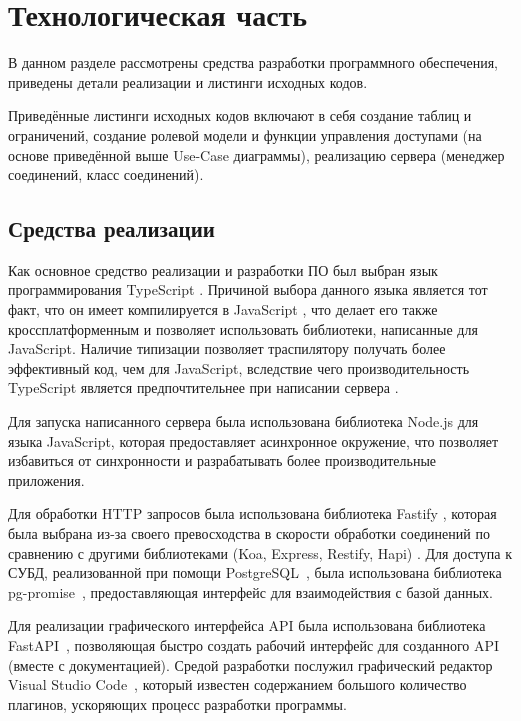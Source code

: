 \section{\large Технологическая часть}

В  данном  разделе  рассмотрены  средства  разработки  программного
обеспечения, приведены детали реализации и листинги исходных кодов.

Приведённые листинги исходных кодов включают в себя создание таблиц и ограничений, создание ролевой модели и функции управления доступами (на основе приведённой выше Use-Case диаграммы), реализацию сервера (менеджер соединений, класс соединений).

\subsection{Средства реализации}
Как  основное  средство  реализации  и  разработки  ПО  был  выбран  язык
программирования  TypeScript \cite{ts}.
Причиной  выбора  данного  языка  является  тот факт,  что  он  имеет компилируется в JavaScript \cite{js}, что делает его также кроссплатформенным и позволяет использовать библиотеки, написанные для JavaScript. 
Наличие типизации позволяет траспилятору получать более эффективный код, чем для JavaScript, вследствие чего производительность TypeScript является предпочтительнее при написании сервера \cite{ts-vs-js}.

Для запуска написанного сервера была использована библиотека Node.js \cite{nodejs} для языка JavaScript, которая предоставляет асинхронное окружение, что позволяет избавиться от синхронности и разрабатывать более производительные приложения.

Для обработки HTTP запросов была использована библиотека Fastify \cite{fastify}, которая была выбрана из-за своего превосходства в скорости обработки соединений по сравнению с другими библиотеками (Koa, Express, Restify, Hapi) \cite{fastify-b}.
Для доступа к СУБД, реализованной при помощи PostgreSQL~\cite{postgres}, была использована библиотека pg-promise~\cite{pg-promise}, предоставляющая интерфейс для взаимодействия с базой данных.

Для реализации графического интерфейса API была использована библиотека FastAPI~\cite{fastapi}, позволяющая быстро создать рабочий интерфейс для созданного API (вместе с документацией).
Средой разработки  послужил  графический  редактор  Visual  Studio  Code~\cite{vscode},  который известен  содержанием  большого  количество  плагинов,  ускоряющих  процесс разработки  программы.


